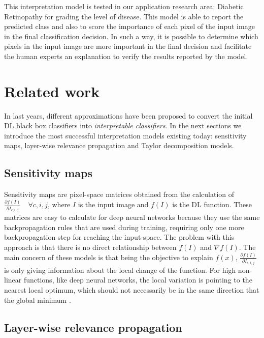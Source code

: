 This interpretation model is tested in our application research area: Diabetic Retinopathy for grading the level of disease. This model is able to report the predicted class and also to score the importance of each pixel of the input image in the final classification decision. In such a way, it is possible to determine which pixels in the input image are more important in the final decision and facilitate the human experts an explanation to verify the results reported by the model.

\section{Related work}\label{score:sec:related}

In last years, different approximations have been proposed to convert the initial DL black box classifiers into \emph{interpretable classifiers}. In the next sections we introduce the most successful interpretation models existing today: sensitivity maps, layer-wise relevance propagation and Taylor decomposition models. 

\subsection{Sensitivity maps}

Sensitivity maps \citep{DBLP:journals/corr/SimonyanVZ13} are pixel-space matrices obtained from the calculation of $ \frac{\partial f(I)}{\partial I_{c,i,j}} \quad \forall c,i,j$, where $I$ is the input image and $f(I)$ is the DL function. These matrices are easy to calculate for deep neural networks because they use the same backpropagation rules that are used during training, requiring only one more backpropagation step for reaching the input-space. The problem with this approach is that there is no direct relationship between $f(I)$ and $\nabla f(I)$. The main concern of these models is that being the objective to explain $f(x)$, $ \frac{\partial f(I)}{\partial I_{c,i,j}}$ is only giving information about the local change of the function. For high non-linear functions, like deep neural networks, the local variation is pointing to the nearest local optimum, which should not necessarily be in the same direction that the global minimum \citep{baehrens2010explain}.


\subsection{Layer-wise relevance propagation} 

